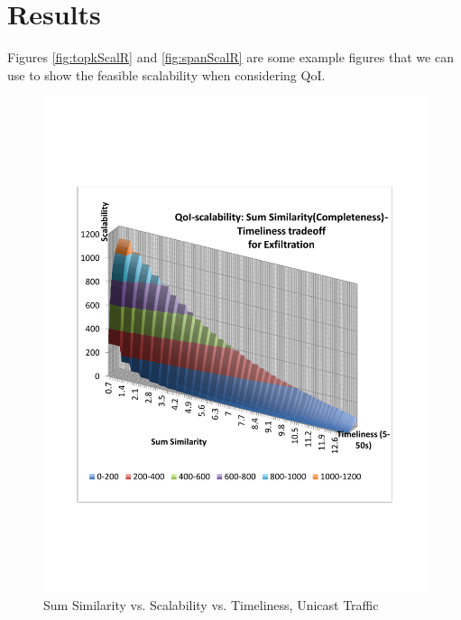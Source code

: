 \section{Results}
\label{sec:results}

Figures \ref{fig:topkScalR} and \ref{fig:spanScalR} are some example figures that we can use to show the feasible scalability when considering QoI.



\begin{figure}
    \includegraphics[scale=0.35]{figures/topk_uni.pdf}
    \caption{Sum Similarity vs. Scalability vs. Timeliness, Unicast Traffic}
    \label{fig:3dplot1}
\end{figure}


